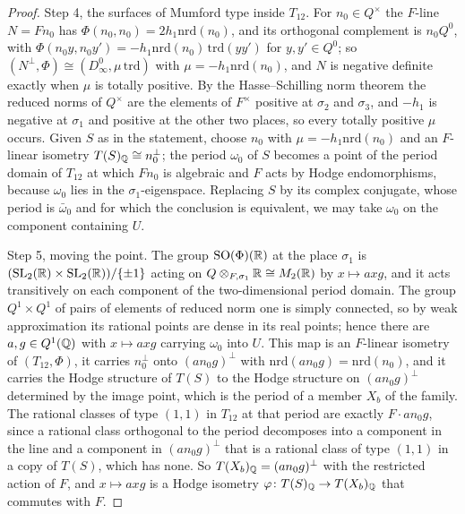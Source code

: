 \begin{proof}
Step 4, the surfaces of Mumford type inside $T_{12}$. For $n_{0}\in Q^{\times}$ the $F$-line $N=Fn_{0}$ has $\Phi(n_{0},n_{0})=2h_{1}\mathrm{nrd}(n_{0})$, and its orthogonal complement is $n_{0}Q^{0}$, with $\Phi(n_{0}y,n_{0}y')=-h_{1}\mathrm{nrd}(n_{0})\,\mathrm{trd}(yy')$ for $y,y'\in Q^{0}$; so $(N^{\perp},\Phi)\cong(D_{\infty}^{0},\mu\,\mathrm{trd})$ with $\mu=-h_{1}\mathrm{nrd}(n_{0})$, and $N$ is negative definite exactly when $\mu$ is totally positive. By the Hasse--Schilling norm theorem \cite[Thm.~33.15]{Rei03} the reduced norms of $Q^{\times}$ are the elements of $F^{\times}$ positive at $\sigma_{2}$ and $\sigma_{3}$, and $-h_{1}$ is negative at $\sigma_{1}$ and positive at the other two places, so every totally positive $\mu$ occurs. Given $S$ as in the statement, choose $n_{0}$ with $\mu=-h_{1}\mathrm{nrd}(n_{0})$ and an $F$-linear isometry $T(S)_{\mathbb{Q}}\cong n_{0}^{\perp}$; the period $\omega_{0}$ of $S$ becomes a point of the period domain of $T_{12}$ at which $Fn_{0}$ is algebraic and $F$ acts by Hodge endomorphisms, because $\omega_{0}$ lies in the $\sigma_{1}$-eigenspace. Replacing $S$ by its complex conjugate, whose period is $\bar\omega_{0}$ and for which the conclusion is equivalent, we may take $\omega_{0}$ on the component containing $U$.

Step 5, moving the point. The group $\mathrm{SO}(\Phi)(\mathbb{R})$ at the place $\sigma_{1}$ is $(\mathrm{SL}_{2}(\mathbb{R})\times\mathrm{SL}_{2}(\mathbb{R}))/\{\pm1\}$ acting on $Q\otimes_{F,\sigma_{1}}\mathbb{R}\cong M_{2}(\mathbb{R})$ by $x\mapsto axg$, and it acts transitively on each component of the two-dimensional period domain. The group $Q^{1}\times Q^{1}$ of pairs of elements of reduced norm one is simply connected, so by weak approximation \cite[Thm.~7.8]{PR94} its rational points are dense in its real points; hence there are $a,g\in Q^{1}(\mathbb{Q})$ with $x\mapsto axg$ carrying $\omega_{0}$ into $U$. This map is an $F$-linear isometry of $(T_{12},\Phi)$, it carries $n_{0}^{\perp}$ onto $(an_{0}g)^{\perp}$ with $\mathrm{nrd}(an_{0}g)=\mathrm{nrd}(n_{0})$, and it carries the Hodge structure of $T(S)$ to the Hodge structure on $(an_{0}g)^{\perp}$ determined by the image point, which is the period of a member $X_{b}$ of the family. The rational classes of type $(1,1)$ in $T_{12}$ at that period are exactly $F\cdot an_{0}g$, since a rational class orthogonal to the period decomposes into a component in the line and a component in $(an_{0}g)^{\perp}$ that is a rational class of type $(1,1)$ in a copy of $T(S)$, which has none. So $T(X_{b})_{\mathbb{Q}}=(an_{0}g)^{\perp}$ with the restricted action of $F$, and $x\mapsto axg$ is a Hodge isometry $\varphi\colon T(S)_{\mathbb{Q}}\to T(X_{b})_{\mathbb{Q}}$ that commutes with $F$.


\end{proof}
